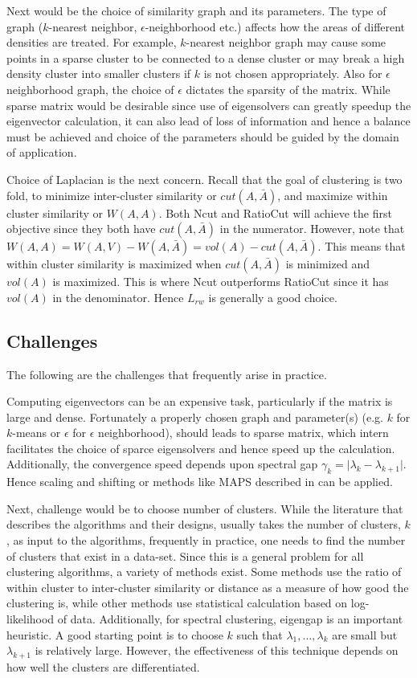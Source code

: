 \documentclass[10pt,a4paper, nocenter]{report}
\newcommand{\abs}[1]{\lvert {#1} \rvert}
\begin{document}
    Next would be the choice of similarity graph and its parameters. The type of graph ($k$-nearest neighbor, $\epsilon$-neighborhood etc.) affects how the areas of different densities are treated. For example, $k$-nearest neighbor graph may cause some points in a sparse cluster to be connected to a dense cluster or may break a high density cluster into smaller clusters if $k$ is not chosen appropriately. Also for $\epsilon$ neighborhood graph, the choice of $\epsilon$ dictates the sparsity of the matrix. While sparse matrix would be desirable since use of eigensolvers can greatly speedup the eigenvector calculation, it can also lead of loss of information and hence a balance must be achieved and choice of the parameters should be guided by the domain of application. 

    Choice of Laplacian is the next concern. Recall that the goal of clustering is two fold, to minimize inter-cluster similarity or $cut(A,\bar{A})$, and maximize within cluster similarity or $W(A,A)$. Both Ncut and RatioCut will achieve the first objective since they both have $cut(A,\bar{A})$ in the numerator. However, note that $W(A,A) = W(A,V) - W(A,\bar{A}) = vol(A) - cut(A,\bar{A})$. This means that within cluster similarity is maximized when $cut(A,\bar{A})$ is minimized and $vol(A)$ is maximized. This is where Ncut outperforms RatioCut since it has $vol(A)$ in the denominator. Hence $L_{rw}$ is generally a good choice.

    \subsection{Challenges}

    The following are the challenges that frequently arise in practice. 

    Computing eigenvectors can be an expensive task, particularly if the matrix is large and dense. Fortunately a properly chosen graph and parameter(s) (e.g. $k$ for $k$-means or $\epsilon$ for $\epsilon$ neighborhood), should leads to sparse matrix, which intern facilitates the choice of sparce eigensolvers and hence speed up the calculation. Additionally, the convergence speed depends upon spectral gap $\gamma_k = \abs{\lambda_k - \lambda_{k+1}}$. Hence scaling and shifting or methods like MAPS described in \cite{Lu2015AcceleratedAF} can be applied. 

    Next, challenge would be to choose number of clusters. While the literature that describes the algorithms and their designs, usually takes the number of clusters, $k$, as input to the algorithms, frequently in practice, one needs to find the number of clusters that exist in a data-set. Since this is a general problem for all clustering algorithms, a variety of methods exist. Some methods use the ratio of within cluster to inter-cluster similarity or distance as a measure of how good the clustering is, while other methods use statistical calculation based on log-likelihood of data. Additionally, for spectral clustering, eigengap is an important heuristic. A good starting point is to choose $k$ such that $\lambda_1,\dots,\lambda_k$ are small but $\lambda_{k+1}$ is relatively large. However, the effectiveness of this technique depends on how well the clusters are differentiated.
\end{document}
